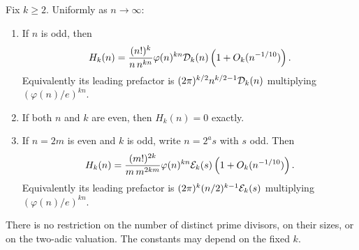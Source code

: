 \begin{theorem}
\label{thm:layeredcoprime}
Fix \(k\geq2\). Uniformly as \(n\to\infty\):
\begin{enumerate}
\item If \(n\) is odd, then
\[
 H_k(n)=
 \frac{(n!)^k}{n\,n^{kn}}\varphi(n)^{kn}{\cal D}_k(n)
                  \left(1+O_k(n^{-1/10})\right).
\]
Equivalently its leading prefactor is
\((2\pi)^{k/2}n^{k/2-1}{\cal D}_k(n)\)
multiplying \((\varphi(n)/e)^{kn}\).
\item If both \(n\) and \(k\) are even, then \(H_k(n)=0\) exactly.
\item If \(n=2m\) is even and \(k\) is odd, write
\(n=2^a s\) with \(s\) odd. Then
\[
 H_k(n)=
 \frac{(m!)^{2k}}{m\,m^{2km}}\varphi(n)^{kn}{\cal E}_k(s)
                   \left(1+O_k(n^{-1/10})\right).
\]
Equivalently its leading prefactor is
\((2\pi)^k(n/2)^{k-1}{\cal E}_k(s)\)
multiplying \((\varphi(n)/e)^{kn}\).
\end{enumerate}
There is no restriction on the number of distinct prime
divisors, on their sizes, or on the two-adic valuation.
The constants may depend on the fixed \(k\).
\end{theorem}
